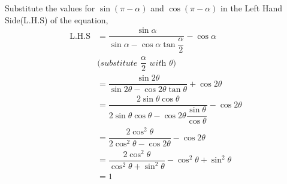 \begin{solution}[\halfpage]
  Substitute the values for $\sin(\pi - \alpha)$ and $\cos(\pi - \alpha)$ 
  in the Left Hand Side(L.H.S) of the equation,
  \begin{align}
    \text{L.H.S} &= \dfrac{\sin\alpha}{\sin\alpha -
    				  \cos\alpha\tan\dfrac{\alpha}{2}}
					  - \cos\alpha \\
    &\textit{(substitute $\dfrac{\alpha}{2}$ with $\theta$)} \nonumber \\
				 &= \dfrac{\sin 2\theta}{\sin 2\theta - 
				 	  \cos 2\theta\tan\theta} + \cos 2\theta \\	
				 &= \dfrac{2\sin\theta\cos\theta}{2\sin\theta\cos\theta - 
				 	  \cos 2\theta\dfrac{\sin\theta}{\cos\theta}} 
				 	  - \cos 2\theta \\ 				
				 &= \dfrac{2\cos ^2\theta}{2\cos^2\theta - 
				 	  \cos 2\theta} - \cos 2\theta \\
				 &= \dfrac{2\cos^2\theta}{\cos^2\theta + \sin^2\theta} -
				 	  \cos^2\theta + \sin^2\theta \\
				 &= 1	  				
  \end{align}
\end{solution}

